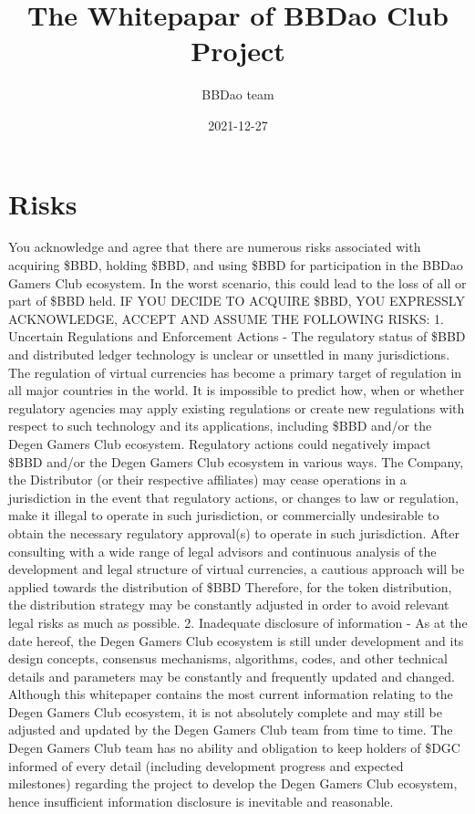 \documentclass[
]{book}
\title{The Whitepapar of BBDao Club Project}
\author{BBDao team}
\date{2021-12-27}
\begin{document}
\maketitle

{
\setcounter{tocdepth}{1}
\tableofcontents
}
\hypertarget{risks}{%
\chapter{Risks}\label{risks}}

You acknowledge and agree that there are numerous risks associated with acquiring \$BBD, holding \$BBD, and using \$BBD for participation in the BBDao Gamers Club ecosystem. In the worst scenario, this could lead to the loss of all or part of \$BBD held. IF YOU DECIDE TO ACQUIRE \$BBD, YOU EXPRESSLY ACKNOWLEDGE, ACCEPT AND ASSUME THE FOLLOWING RISKS:
1. Uncertain Regulations and Enforcement Actions - The regulatory status of \$BBD and distributed ledger technology is unclear or unsettled in many jurisdictions. The regulation of virtual currencies has become a primary target of regulation in all major countries in the world. It is impossible to predict how, when or whether regulatory agencies may apply existing regulations or create new regulations with respect to such technology and its applications, including \$BBD and/or the Degen Gamers Club ecosystem. Regulatory actions could negatively impact \$BBD and/or the Degen Gamers Club ecosystem in various ways. The Company, the Distributor (or their respective affiliates) may cease operations in a jurisdiction in the event that regulatory actions, or changes to law or regulation, make it illegal to operate in such jurisdiction, or commercially undesirable to obtain the necessary regulatory approval(s) to operate in such jurisdiction. After consulting with a wide range of legal advisors and continuous analysis of the development and legal structure of virtual currencies, a cautious approach will be applied towards the distribution of \$BBD Therefore, for the token distribution, the distribution strategy may be constantly adjusted in order to avoid relevant legal risks as much as possible.
2. Inadequate disclosure of information - As at the date hereof, the Degen Gamers Club ecosystem is still under development and its design concepts, consensus mechanisms, algorithms, codes, and other technical details and parameters may be constantly and frequently updated and changed. Although this whitepaper contains the most current information relating to the Degen Gamers Club ecosystem, it is not absolutely complete and may still be adjusted and updated by the Degen Gamers Club team from time to time. The Degen Gamers Club team has no ability and obligation to keep holders of \$DGC informed of every detail (including development progress and expected milestones) regarding the project to develop the Degen Gamers Club ecosystem, hence insufficient information disclosure is inevitable and reasonable.
\end{document}
